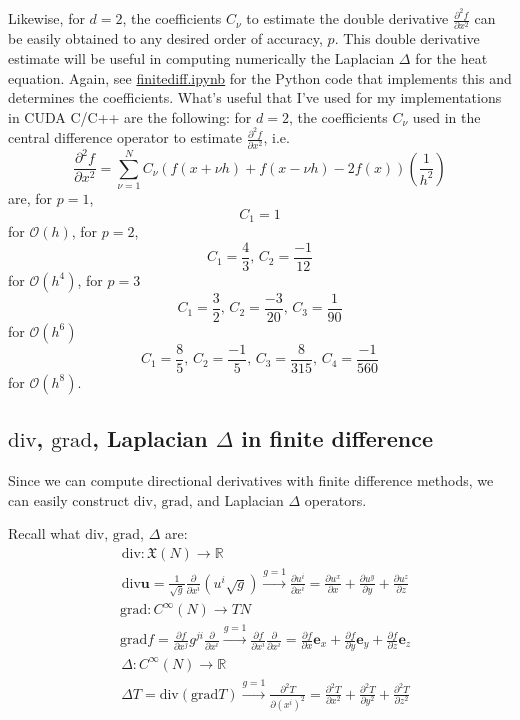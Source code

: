 \documentclass[10pt]{amsart}
\begin{document}
Likewise, for $d=2$, the coefficients $C_{\nu}$ to estimate the double derivative $\frac{ \partial^2 f}{ \partial x^2}$ can be easily obtained to any desired order of accuracy, $p$.  This double derivative estimate will be useful in computing numerically the Laplacian $\Delta$ for the heat equation.  Again, see \href{https://nbviewer.jupyter.org/github/ernestyalumni/CompPhys/blob/master/finitediff.ipynb}{finitediff.ipynb} for the Python code that implements this and determines the coefficients.  What's useful that I've used for my implementations in CUDA C/C++ are the following: for $d=2$, the coefficients $C_{\nu}$ used in the central difference operator to estimate $\frac{\partial^2 f}{ \partial x^2}$, i.e.
\[
\frac{ \partial^2 f}{ \partial x^2} = \sum_{\nu = 1}^N C_{\nu} (f(x+\nu h) + f(x-\nu h) - 2f(x)) \left( \frac{1}{h^2} \right)
\]
are, for $p=1$,
\[
C_{1} = 1
\]
for $\mathcal{O}(h)$, for $p=2$,
\[
C_1 = \frac{4}{3}, \, C_2 = \frac{-1}{12}
\]
for $\mathcal{O}(h^4)$, for $p=3$
\[
C_1 = \frac{3}{2}, \, C_2 = \frac{-3}{20}, \, C_3 = \frac{1}{90}
\]
for $\mathcal{O}(h^6)$
\[
C_1 = \frac{8}{5}, \, C_2 = \frac{-1}{5}, \, C_3 = \frac{8}{315}, \, C_4 = \frac{-1}{560}
\]
for $\mathcal{O}(h^8)$.  

\subsection{ $\text{div}$, $\text{grad}$, Laplacian $\Delta$ in finite difference }

Since we can compute directional derivatives with finite difference methods, we can easily construct $\text{div}$, $\text{grad}$, and Laplacian $\Delta $ operators.

Recall what $\text{div}$, $\text{grad}$, $\Delta$ are:
\[
\begin{aligned}
  & \text{div} : \mathfrak{X}(N) \to \mathbb{R} \\ 
  & \text{div}\mathbf{u} = \frac{1}{\sqrt{g}} \frac{ \partial }{ \partial x^i} (u^i \sqrt{g}) \xrightarrow{ g = 1} \frac{ \partial u^i}{ \partial x^i} = \frac{ \partial u^x}{ \partial x} +  \frac{ \partial u^y}{ \partial y} +  \frac{ \partial u^z}{ \partial z}
  \end{aligned}
\]
\[
\begin{aligned}
  & \text{grad}: C^{\infty}(N) \to TN \\ 
  & \text{grad}f = \frac{ \partial f}{ \partial x^j} g^{ji} \frac{ \partial }{ \partial x^i} \xrightarrow{g=1} \frac{ \partial f}{ \partial x^i} \frac{ \partial }{ \partial x^i} = \frac{ \partial f}{ \partial x} \mathbf{e}_x + \frac{ \partial f}{ \partial y} \mathbf{e}_y + \frac{ \partial f}{ \partial z} \mathbf{e}_z
  \end{aligned}
\]
\[
\begin{aligned}
  & \Delta : C^{\infty}(N) \to \mathbb{R} \\ 
  & \Delta T = \text{div}(\text{grad} T) \xrightarrow{ g= 1} \frac{ \partial^2 T}{ \partial (x^i)^2 } = \frac{ \partial^2 T}{ \partial x^2 } + \frac{ \partial^2 T}{ \partial y^2 } + \frac{ \partial^2 T}{ \partial z^2 } 
  \end{aligned}
\]
\end{document}
